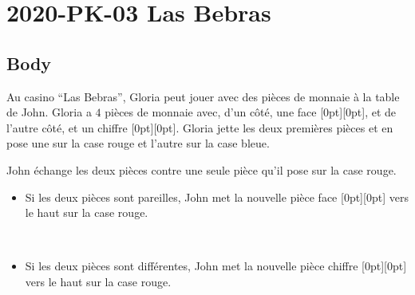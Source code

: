 \documentclass[a4paper,11pt]{report}
\newcommand{\taskGraphicsFolder}{..}
\begin{document}
\section*{\centering{} 2020-PK-03 Las Bebras}


\subsection*{Body}

Au casino “Las Bebras”, Gloria peut jouer avec des pièces de monnaie à la table de John. Gloria a $4$ pièces de monnaie avec, d’un côté, une face \raisebox{-0.5ex}[0pt][0pt]{}, et de l’autre côté, et un chiffre \raisebox{-0.5ex}[0pt][0pt]{}. Gloria jette les deux premières pièces et en pose une sur la case rouge et l’autre sur la case bleue.

{\centering%
\par}

John échange les deux pièces contre une seule pièce qu’il pose sur la case rouge.

\begin{itemize}
  \item Si les deux pièces sont pareilles, John met la nouvelle pièce face \raisebox{-0.5ex}[0pt][0pt]{} vers le haut sur la case rouge.

\raisebox{-0.5ex}{} \\
\raisebox{-0.5ex}{}
  \item Si les deux pièces sont différentes, John met la nouvelle pièce chiffre \raisebox{-0.5ex}[0pt][0pt]{} vers le haut sur la case rouge.

\raisebox{-0.5ex}{} \\
\raisebox{-0.5ex}{}
\end{itemize}
\end{document}
